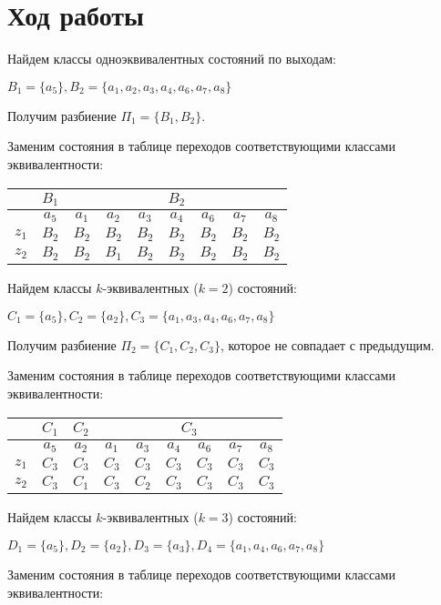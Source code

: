 \documentclass[listings]{labreport}
\begin{document}
\section*{Ход работы}

Найдем классы одноэквивалентных состояний по выходам:

$B_1 = \{a_5\}, B_2 = \{a_1, a_2, a_3, a_4, a_6, a_7, a_8\}$

Получим разбиение $\Pi_1 = \{B_1, B_2\}$.

\newpage
Заменим состояния в таблице переходов соответствующими классами эквивалентности:

\begin{tabular}{|*{9}{c|}}
\hline
      & $B_1$ & \multicolumn{7}{c|}{$B_2$}\\\hline
      & $a_5$ & $a_1$ & $a_2$ & $a_3$ & $a_4$ & $a_6$ & $a_7$ & $a_8$\\\hline
$z_1$ & $B_2$ & $B_2$ & $B_2$ & $B_2$ & $B_2$ & $B_2$ & $B_2$ & $B_2$\\\hline
$z_2$ & $B_2$ & $B_2$ & $B_1$ & $B_2$ & $B_2$ & $B_2$ & $B_2$ & $B_2$\\\hline
\end{tabular}

Найдем классы $k$-эквивалентных ($k=2$) состояний:

$C_1 = \{a_5\}, C_2 = \{a_2\}, C_3 = \{a_1, a_3, a_4, a_6, a_7, a_8\}$

Получим разбиение $\Pi_2 = \{C_1, C_2, C_3\}$, которое не совпадает с предыдущим.

Заменим состояния в таблице переходов соответствующими классами эквивалентности:

\begin{tabular}{|*{9}{c|}}
\hline
      & $C_1$ & $C_2$ & \multicolumn{6}{c|}{$C_3$}\\\hline
      & $a_5$ & $a_2$ & $a_1$ & $a_3$ & $a_4$ & $a_6$ & $a_7$ & $a_8$\\\hline
$z_1$ & $C_3$ & $C_3$ & $C_3$ & $C_3$ & $C_3$ & $C_3$ & $C_3$ & $C_3$\\\hline
$z_2$ & $C_3$ & $C_1$ & $C_3$ & $C_2$ & $C_3$ & $C_3$ & $C_3$ & $C_3$\\\hline
\end{tabular}

Найдем классы $k$-эквивалентных ($k=3$) состояний:

$D_1 = \{a_5\}, D_2 = \{a_2\}, D_3 = \{a_3\}, D_4 = \{a_1, a_4, a_6, a_7, a_8\}$

Заменим состояния в таблице переходов соответствующими классами эквивалентности:
\end{document}

